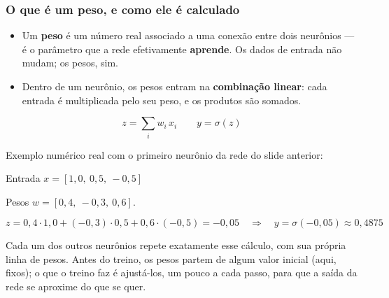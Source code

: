 \begin{frame}[shrink]
	\frametitle{O que é um peso, e como ele é calculado}
	\small
	\begin{itemize}
		\item Um \textbf{peso} é um número real associado a uma conexão entre dois neurônios --- é o parâmetro que a rede efetivamente \textbf{aprende}. Os dados de entrada não mudam; os pesos, sim.\newline
		
		\item Dentro de um neurônio, os pesos entram na \textbf{combinação linear}: cada entrada é multiplicada pelo seu peso, e os produtos são somados.
	\end{itemize}
	
	\begin{equation*}
		z = \sum_i w_i \, x_i \qquad y = \sigma(z)
	\end{equation*}
	
	\par Exemplo numérico real com o primeiro neurônio da rede do slide anterior:\newline
	\par Entrada $x = [1{,}0,\ 0{,}5,\ -0{,}5]$
	\par Pesos $w = [0{,}4,\ -0{,}3,\ 0{,}6]$.
	
	\begin{equation*}
		z = 0{,}4 \!\cdot\! 1{,}0 + (-0{,}3) \!\cdot\! 0{,}5 + 0{,}6 \!\cdot\! (-0{,}5) = -0{,}05
		\quad\Longrightarrow\quad
		y = \sigma(-0{,}05) \approx 0{,}4875
	\end{equation*}
	
	\par Cada um dos outros neurônios repete exatamente esse cálculo, com sua própria linha de pesos. Antes do treino, os pesos partem de algum valor inicial (aqui, fixos); o que o treino faz é ajustá-los, um pouco a cada passo, para que a saída da rede se aproxime do que se quer.
\end{frame}

